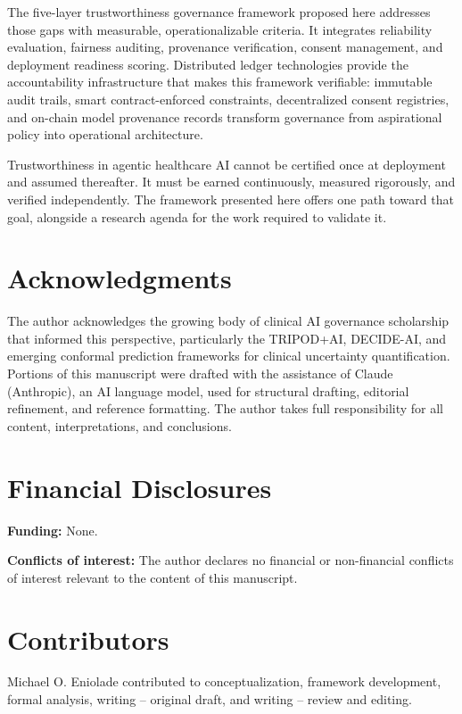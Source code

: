 The five-layer trustworthiness governance framework proposed here
addresses those gaps with measurable, operationalizable criteria. It
integrates reliability evaluation, fairness auditing, provenance
verification, consent management, and deployment readiness scoring.
Distributed ledger technologies provide the accountability
infrastructure that makes this framework verifiable: immutable audit
trails, smart contract-enforced constraints, decentralized consent
registries, and on-chain model provenance records transform governance
from aspirational policy into operational architecture.

Trustworthiness in agentic healthcare AI cannot be certified once at
deployment and assumed thereafter. It must be earned continuously,
measured rigorously, and verified independently. The framework presented
here offers one path toward that goal, alongside a research agenda for
the work required to validate it.


\section*{Acknowledgments}\label{acknowledgments}

The author acknowledges the growing body of clinical AI governance
scholarship that informed this perspective, particularly the TRIPOD+AI,
DECIDE-AI, and emerging conformal prediction frameworks for clinical
uncertainty quantification. Portions of this manuscript were drafted
with the assistance of Claude (Anthropic), an AI language model, used
for structural drafting, editorial refinement, and reference formatting.
The author takes full responsibility for all content, interpretations,
and conclusions.


\section*{Financial Disclosures}\label{financial-disclosures}

\textbf{Funding:} None.

\textbf{Conflicts of interest:} The author declares no financial or
non-financial conflicts of interest relevant to the content of this
manuscript.


\section*{Contributors}\label{contributors}

Michael O. Eniolade contributed to conceptualization, framework
development, formal analysis, writing -- original draft, and writing --
review and editing.


